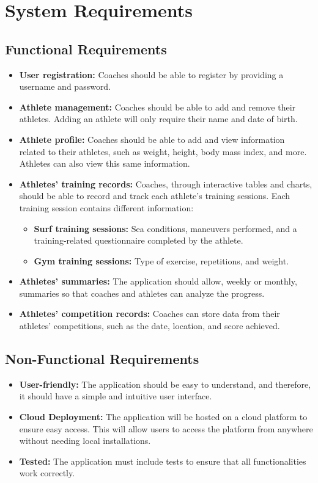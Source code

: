 \documentclass[a4paper,twoside,11pt]{article}
\begin{document}
\section{System Requirements}

\subsection{Functional Requirements}
\begin{itemize}
\item \textbf{User registration:} Coaches should be able to register by providing a username and password.
\item \textbf{Athlete management:} Coaches should be able to add and remove their athletes. Adding an athlete will only require their name and date of birth.
\item \textbf{Athlete profile:} Coaches should be able to add and view information related to their athletes, such as weight, height, body mass index, and more. Athletes can also view this same information.
\item \textbf{Athletes' training records:} Coaches, through interactive tables and charts, should be able to record and track each athlete's training sessions. Each training session contains different information:
\begin{itemize}
\item \textbf{Surf training sessions:} Sea conditions, maneuvers performed, and a training-related questionnaire completed by the athlete.
\item \textbf{Gym training sessions:} Type of exercise, repetitions, and weight.
\end{itemize}
\item \textbf{Athletes' summaries:} The application should allow, weekly or monthly, summaries so that coaches and athletes can analyze the progress.
\item \textbf{Athletes' competition records:} Coaches can store data from their athletes' competitions, such as the date, location, and score achieved.
\end{itemize}

\subsection{Non-Functional Requirements}
\begin{itemize}
\item \textbf{User-friendly:} The application should be easy to understand, and therefore, it should have a simple and intuitive user interface.
\item \textbf{Cloud Deployment:} The application will be hosted on a cloud platform to ensure easy access. This will allow users to access the platform from anywhere without needing local installations.
\item \textbf{Tested:} The application must include tests to ensure that all functionalities work correctly.
\end{itemize}
\end{document}
